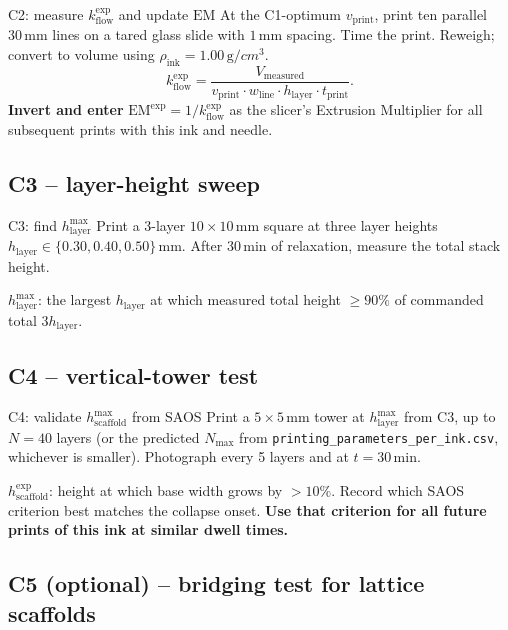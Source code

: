 \documentclass[11pt,a4paper]{article}
\begin{document}
\begin{stepbox}{C2: measure $k_\mathrm{flow}^\mathrm{exp}$ and update $\mathrm{EM}$}
At the C1-optimum $v_\mathrm{print}$, print ten parallel $30\,\si{\mm}$
lines on a tared glass slide with $1\,\si{\mm}$ spacing. Time the print.
Reweigh; convert to volume using $\rho_\mathrm{ink}=1.00\,\si{\g/cm^3}$.
\[
k_\mathrm{flow}^\mathrm{exp}
=\frac{V_\mathrm{measured}}{v_\mathrm{print}\cdot w_\mathrm{line}\cdot
h_\mathrm{layer}\cdot t_\mathrm{print}}.
\]
\textbf{Invert and enter}
$\mathrm{EM}^\mathrm{exp}=1/k_\mathrm{flow}^\mathrm{exp}$ as the slicer's
Extrusion Multiplier for all subsequent prints with this ink and needle.
\end{stepbox}

\subsection{C3 -- layer-height sweep}

\begin{stepbox}{C3: find $h_\mathrm{layer}^{\max}$}
Print a 3-layer $10\times 10\,\si{\mm}$ square at three layer heights
$h_\mathrm{layer}\in\{0.30,0.40,0.50\}\,\si{\mm}$. After
30\,\si{\minute} of relaxation, measure the total stack height.

$h_\mathrm{layer}^{\max}$: the largest $h_\mathrm{layer}$ at which
measured total height $\geq 90\%$ of commanded total $3h_\mathrm{layer}$.
\end{stepbox}

\subsection{C4 -- vertical-tower test}

\begin{stepbox}{C4: validate $h_\mathrm{scaffold}^{\max}$ from SAOS}
Print a $5\times 5\,\si{\mm}$ tower at $h_\mathrm{layer}^{\max}$ from
C3, up to $N=40$ layers (or the predicted $N_\mathrm{max}$ from
\texttt{printing\_parameters\_per\_ink.csv}, whichever is smaller).
Photograph every 5 layers and at $t=30\,\si{\minute}$.

$h_\mathrm{scaffold}^\mathrm{exp}$: height at which base width grows
by $>10\%$. Record which SAOS criterion best matches the collapse onset.
\textbf{Use that criterion for all future prints of this ink at similar
dwell times.}
\end{stepbox}

\subsection{C5 (optional) -- bridging test for lattice scaffolds}
\end{document}
